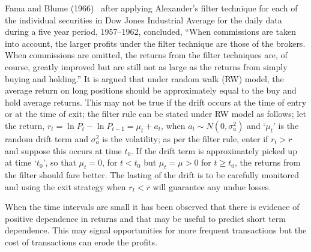 Fama and Blume (1966)~\cite{famablume} after applying Alexander's filter technique for each of the individual securities in Dow Jones Industrial Average for the daily data during a five year period, 1957--1962, concluded, ``When commissions are taken into account, the larger profits under the filter technique are those of the brokers. When commissions are omitted, the returns from the filter techniques are, of course, greatly improved but are still not as large as the returns from simply buying and holding.'' It is argued that under random walk (RW) model, the average return on long positions should be approximately equal to the buy and hold average returns. This may not be true if the drift occurs at the time of entry or at the time of exit; the filter rule can be stated under RW model as follows; let the return, $r_{t} = \ln{P_{t}} - \ln{P_{t-1}} = \mu_{t} + a_{t}$, when $a_{t} \sim N(0, \sigma_{a}^2)$ and `$\mu_{t}$' is the random drift term and $\sigma_{a}^2$ is the volatility; as per the filter rule, enter if $r_{t} > r$ and suppose this occurs at time $t_{0}$. If the drift term is approximately picked up at time `$t_{0}$', so that $\mu_{t} = 0$, for $t < t_{0}$ but $\mu_{t} = \mu > 0$ for $t \geq t_{0}$, the returns from the filter should fare better. The lasting of the drift is to be carefully monitored and using the exit strategy when $r_{t} < r$ will guarantee any undue losses.


When the time intervals are small it has been observed that there is evidence of positive dependence in returns and that may be useful to predict short term dependence. This may signal opportunities for more frequent transactions but the cost of transactions can erode the profits. \twomedskip


